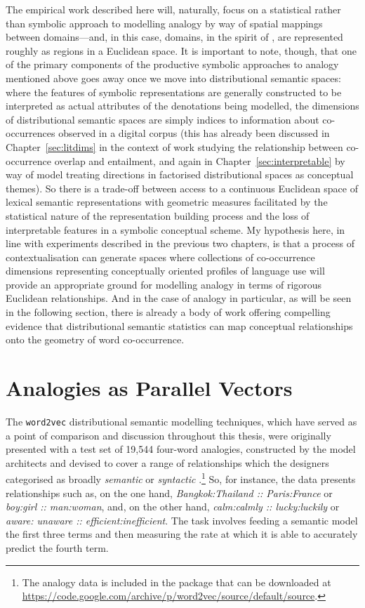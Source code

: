 The empirical work described here will, naturally, focus on a statistical rather than symbolic approach to modelling analogy by way of spatial mappings between domains---and, in this case, domains, in the spirit of \cite{Gardenfors2000}, are represented roughly as regions in a Euclidean space.  It is important to note, though, that one of the primary components of the productive symbolic approaches to analogy mentioned above goes away once we move into distributional semantic spaces: where the features of symbolic representations are generally constructed to be interpreted as actual attributes of the denotations being modelled, the dimensions of distributional semantic spaces are simply indices to information about co-occurrences observed in a digital corpus (this has already been discussed in Chapter~\ref{sec:litdims} in the context of  work studying the relationship between co-occurrence overlap and entailment, and again in Chapter~\ref{sec:interpretable} by way of  model treating directions in factorised distributional spaces as conceptual themes).  So there is a trade-off between access to a continuous Euclidean space of lexical semantic representations with geometric measures facilitated by the statistical nature of the representation building process and the loss of interpretable features in a symbolic conceptual scheme.  My hypothesis here, in line with experiments described in the previous two chapters, is that a process of contextualisation can generate spaces where collections of co-occurrence dimensions representing conceptually oriented profiles of language use will provide an appropriate ground for modelling analogy in terms of rigorous Euclidean relationships.  And in the case of analogy in particular, as will be seen in the following section, there is already a body of work offering compelling evidence that distributional semantic statistics can map conceptual relationships onto the geometry of word co-occurrence.

\section{Analogies as Parallel Vectors} \label{sec:parallel}
The \texttt{word2vec} distributional semantic modelling techniques, which have served as a point of comparison and discussion throughout this thesis, were originally presented with a test set of 19,544 four-word analogies, constructed by the model architects and devised to cover a range of relationships which the designers categorised as broadly \emph{semantic} or \emph{syntactic} \citep{MikolovEA2013b,MikolovEA2013c}.\footnote{The analogy data is included in the package that can be downloaded at \url{https://code.google.com/archive/p/word2vec/source/default/source}.}  So, for instance, the data presents relationships such as, on the one hand, \emph{Bangkok:Thailand :: Paris:France} or \emph{boy:girl :: man:woman}, and, on the other hand, \emph{calm:calmly :: lucky:luckily} or \emph{aware: unaware :: efficient:inefficient}.  The task involves feeding a semantic model the first three terms and then measuring the rate at which it is able to accurately predict the fourth term.

